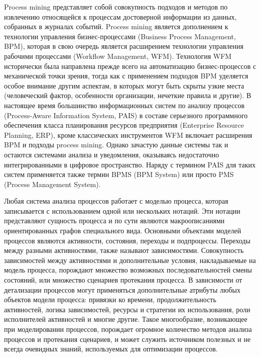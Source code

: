 \documentclass[
11pt,%
tightenlines,%
twoside,%
onecolumn,%
nofloats,%
nobibnotes,%
nofootinbib,%
superscriptaddress,%
noshowpacs,%
centertags]%
{revtex4}
\begin{document}
Process mining представляет собой совокупность подходов и методов по извлечению относящейся к процессам достоверной информации из данных, собранных в журналах событий.
Process mining является дополнением к технологии управления бизнес-процессами (Business Process Management, BPM), которая в свою очередь является расширением технологии управления рабочими процессами (Workflow Management, WFM).
Технология WFM исторически была направлена прежде всего на автоматизацию бизнес-процессов с механической точки зрения, тогда как с применением подходов BPM уделяется особое внимание другим аспектам, в которых могут быть скрыты узкие места (человеческий фактор, особенности организации, нечеткие правила и другие).
В настоящее время большинство информационных систем по анализу процессов (Process-Aware Information System, PAIS) в составе серьезного программного обеспечения класса планирования ресурсов предприятия (Enterprise Resource Planning, ERP), кроме классических инструментов WFM включает расширения BPM и подходы process mining.
Однако зачастую данные системы так и остаются системами анализа и уведомления, оказываясь недостаточно интегрированными в цифровое пространство.
Наряду с термином PAIS для таких систем применяется также термин BPMS (BPM System) или просто PMS (Process Management System).

Любая система анализа процессов работает с моделью процесса, которая записывается с использованием одной или нескольких нотаций.
Эти нотации представляют сущность процесса и по сути являются макроописаниями ориентированных графов специального вида.
Основными объектами моделей процессов являются активности, состояния, переходы и подпроцессы.
Переходы между разными активностями, также называют зависимостями.
Совокупность зависимостей между активностями и дополнительные условия, накладываемые на модель процесса, порождают множество возможных последовательностей смены состояний, или множество сценариев протекания процесса.
В зависимости от детализации процессов могут применяться дополнительные атрибуты любых объектов модели процесса: привязки ко времени, продолжительность активностей, логика зависимостей, ресурсы и стратегии их использования, роли исполнителей активностей и многие другие.
Такое многообразие, возникающее при моделировании процессов, порождает огромное количество методов анализа процессов и протекания сценариев, и может служить источником полезных и не всегда очевидных знаний, используемых для оптимизации процессов.
\end{document}

